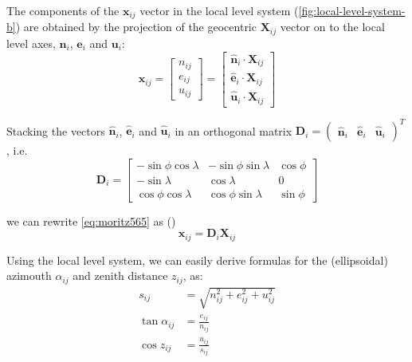 The components of the $\bm{x}_{ij}$ vector in the local level system 
(\ref{fig:local-level-system-b})  are obtained by the projection of the geocentric 
$\bm{X}_{ij}$ vector on to the local level axes, $\bm{n}_i$, $\bm{e}_i$ and 
$\bm{u}_i$:
\begin{equation}
  \label{eq:moritz565}
  \bm{x}_{ij} = \begin{bmatrix} n_{ij} \\ e_{ij} \\ u_{ij} \end{bmatrix} = 
    \begin{bmatrix} 
      \bm{\hat{n}}_i \cdot \bm{X}_{ij} \\
      \bm{\hat{e}}_i \cdot \bm{X}_{ij} \\
      \bm{\hat{u}}_i \cdot \bm{X}_{ij}
      \end{bmatrix}
\end{equation}

Stacking the vectors $\bm{\hat{n}}_i$, $\bm{\hat{e}}_i$ and $\bm{\hat{u}}_i$ 
in an orthogonal matrix $\bm{D}_i = \begin{pmatrix} \bm{\hat{n}}_i & \bm{\hat{e}}_i & \bm{\hat{u}}_i \end{pmatrix}^T$, i.e.
\begin{equation}
  \label{eq:moritz566}
  \bm{D}_i = \begin{bmatrix}
    -\sin \phi \cos \lambda & -\sin \phi \sin \lambda & \cos \phi \\
    -\sin \lambda           & \cos \lambda            & 0 \\
    \cos \phi \cos \lambda  & \cos \phi \sin \lambda  & \sin \phi
  \end{bmatrix}
\end{equation}

we can rewrite \ref{eq:moritz565} as (\cite{moritz})
\begin{equation}
  \label{eq:moritz567}
  \bm{x}_{ij} = \bm{D}_i \bm{X}_{ij}
\end{equation}

Using the local level system, we can easily derive formulas for the 
(ellipsoidal) azimouth $\alpha _{ij}$ and zenith distance $z_{ij}$, as:
\begin{equation}
  \begin{aligned}
    s_{ij} &= \sqrt{ n^2_{ij} + e^2_{ij} + u^2_{ij}} \\
    \tan{\alpha _{ij}} &= \frac{e_{ij}}{n_{ij}} \\
    \cos{z_{ij}} &= \frac{u_{ij}}{s_{ij}}
  \end{aligned}
\end{equation}


